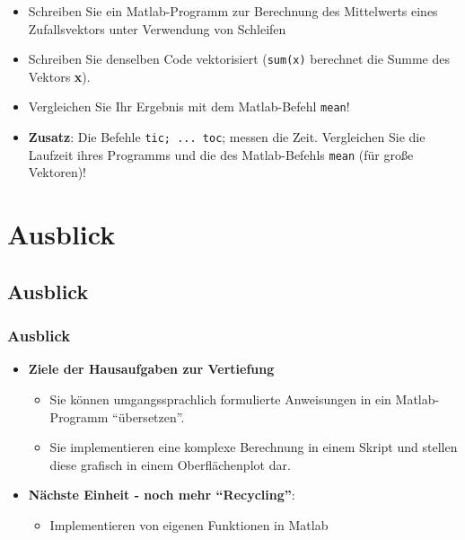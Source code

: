       \secMexercise
      \begin{frame}
          \frameMexercise
          \begin{exercise}
              \sloppy
              \begin{itemize}
                \item Schreiben Sie ein Matlab-Programm zur Berechnung des Mittelwerts eines Zufallsvektors unter Verwendung von Schleifen
                \item Schreiben Sie denselben Code vektorisiert (\texttt{sum(x)} berechnet die Summe des Vektors \textbf{x}).
                \item Vergleichen Sie Ihr Ergebnis mit dem Matlab-Befehl \texttt{mean}!
                \item \textbf{Zusatz}: Die Befehle \texttt{tic; ... toc}; messen die Zeit. Vergleichen Sie die Laufzeit ihres Programms und die des
                Matlab-Befehls \texttt{mean} (für große Vektoren)!
              \end{itemize}
          \end{exercise}
      \end{frame}

  \section{Ausblick}

      \subsection{Ausblick}
      \begin{frame}
          \frametitle{Ausblick}
          \begin{itemize}
            \item \textbf{Ziele der Hausaufgaben zur Vertiefung}
            \begin{itemize}
              \item Sie können umgangssprachlich formulierte Anweisungen in ein Matlab-Programm ``übersetzen''.
              \item Sie implementieren eine komplexe Berechnung in einem Skript und stellen diese grafisch in einem Oberflächenplot dar.
            \end{itemize}
            \item \textbf{Nächste Einheit - noch mehr ``Recycling''}:
            \begin{itemize}
              \item Implementieren von eigenen Funktionen in Matlab
            \end{itemize}
          \end{itemize}
      \end{frame}



